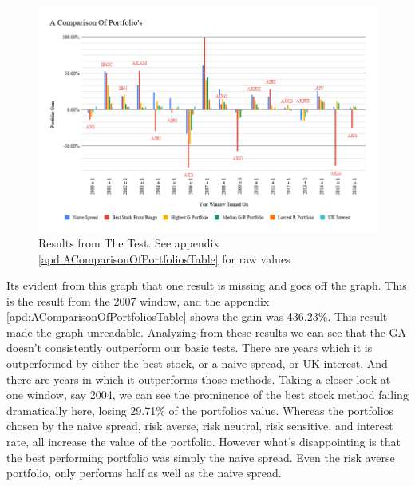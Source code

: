 \documentclass[11pt]{article}
\begin{document}
    \begin{figure}[H] %
        \includegraphics[width=\textwidth]{AComparisonOfPortfolios}
        \caption{Results from The Test. See appendix \ref{apd:AComparisonOfPortfoliosTable} for raw values}
            \label{fig:AComparisonOfPortfolios}
    \end{figure}

    Its evident from this graph that one result is missing and goes off the graph. This
    is the result from the 2007 window, and the appendix \ref{apd:AComparisonOfPortfoliosTable}
    shows the gain was 436.23\%. This result made the graph unreadable. Analyzing
    from these results we can see that the GA doesn't consistently outperform our basic
    tests. There are years which it is outperformed by either the best stock, or a naive
    spread, or UK interest. And there are years in which it outperforms those methods.
    Taking a closer
    look at one window, say 2004, we can see the prominence of the best stock method
    failing dramatically here, losing 29.71\% of the portfolios value. Whereas
    the portfolios chosen by the naive spread, risk averse, risk neutral, risk
    sensitive, and interest rate, all increase the value of the portfolio. However
    what's disappointing is that the best performing portfolio was simply the naive spread.
    Even the risk averse portfolio, only performs half as well as the naive spread.
\end{document}
